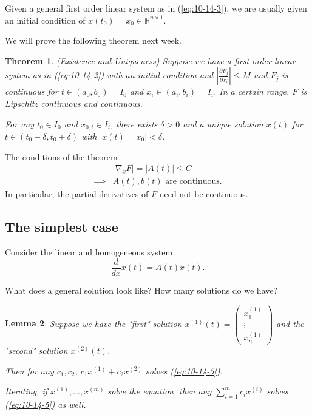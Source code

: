 \documentclass{tufte-handout}
\newcommand*\R{\mathbb{R}}
\newtheorem{thm}{Theorem}[subsection]
\newtheorem{lemma}[thm]{Lemma}
\theoremstyle{definition}
\begin{document}
Given a general first order linear system as in (\ref{eq:10-14-3}), we are usually given an initial condition of $x(t_0) = x_0 \in \R^{n \times 1}$.

We will prove the following theorem next week.
\begin{thm}
	(Existence and Uniqueness) Suppose we have a first-order linear system as in (\ref{eq:10-14-2}) with an initial condition and $\left| \frac{\partial F_j}{\partial x_i}  \right| \le M$ and $F_j$ is continuous for $t \in (a_0,b_0) = I_0$ and $x_i \in (a_i, b_i) = I_i$. In a certain range, $F$ is Lipschitz continuous and continuous.

	For any $t_0 \in I_0$ and $x_{0,i} \in I_i$, there exists $\delta > 0$ and a unique solution $x(t)$ for $t \in \left( t_0 - \delta, t_0 + \delta \right)$ with $\left| x(t) = x_0 \right| < \delta$.
\end{thm}

The conditions of the theorem 
\begin{align}
	&\left| \nabla_x F \right| = \left| A(t) \right| \le C \\
	\implies &A(t), b(t) \text{ are continuous}.
\end{align}
In particular, the partial derivatives of $F$ need not be continuous.

\subsection{The simplest case}

Consider the linear and homogeneous system 
\begin{equation}
	\frac{d}{dx}x(t) = A(t) x(t) \label{eq:10-14-5}.
\end{equation}

What does a general solution look like? How many solutions do we have?

\begin{lemma}
	Suppose we have the "first" solution $x^{(1)}(t) = \begin{pmatrix}
	x_1^{(1)} \\
	\vdots \\
	x_n^{(1)}
	\end{pmatrix} $ and the "second" solution $x^{(2)}(t)$.

	Then for any $c_1,c_2$, $c_1 x^{(1)} + c_2 x^{(2)}$ solves (\ref{eq:10-14-5}).

	Iterating, if $x^{(1)}, \ldots, x^{(m)}$ solve the equation, then any $\sum_{i=1}^{m} c_i x^{(i)}$ solves (\ref{eq:10-14-5}) as well.
\end{lemma}
\end{document}

